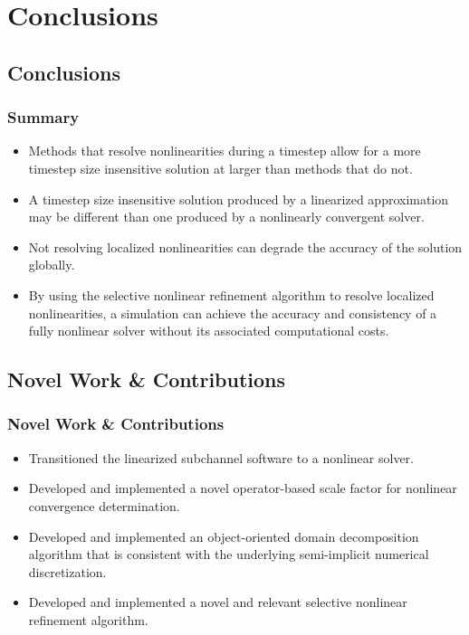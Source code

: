 \documentclass[compress,xcolor=table]{beamer}
\begin{document}
\section[Conclusions]{Conclusions}
\subsection[Conclusions]{Conclusions}
\begin{frame}
\frametitle{Summary}

\begin{itemize}
\item{Methods that resolve nonlinearities during a timestep allow for a more timestep size insensitive solution at larger \dtmax{} than methods that do not.}
\item{A timestep size insensitive solution produced by a linearized approximation may be different than one produced by a nonlinearly convergent solver.}
\item{Not resolving localized nonlinearities can degrade the accuracy of the solution globally.}
\item{By using the selective nonlinear refinement algorithm to resolve localized nonlinearities, a simulation can achieve the accuracy and consistency of a fully nonlinear solver without its associated computational costs.}
\end{itemize}

\end{frame}
\subsection[Novel Work \& Contributions]{Novel Work \& Contributions}
\begin{frame}
\frametitle{Novel Work \& Contributions}

\begin{itemize}
\item{Transitioned the linearized subchannel software \cobra{} to a nonlinear solver.}
\item{Developed and implemented a novel operator-based scale factor for nonlinear convergence determination.}
\item{Developed and implemented an object-oriented domain decomposition algorithm that is consistent with the underlying semi-implicit numerical discretization.}
\item{Developed and implemented a novel and relevant selective nonlinear refinement algorithm.}
\end{itemize}

\end{frame}
\end{document}
